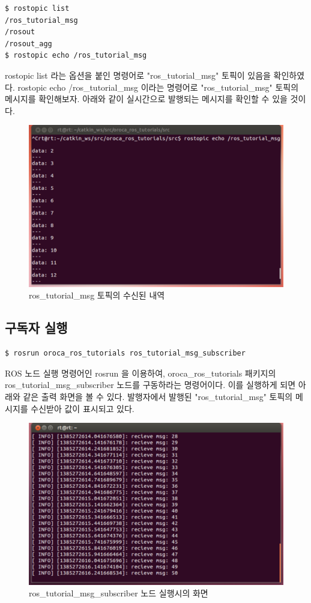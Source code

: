 \begin{lstlisting}[language=ROS]
$ rostopic list
/ros_tutorial_msg
/rosout
/rosout_agg
$ rostopic echo /ros_tutorial_msg
\end{lstlisting}

rostopic list 라는 옵션을 붙인 명령어로 "ros\_tutorial\_msg" 토픽이 있음을 확인하였다. rostopic echo /ros\_tutorial\_msg 이라는 명령어로 "ros\_tutorial\_msg" 토픽의 메시지를 확인해보자. 아래와 같이 실시간으로 발행되는 메시지를 확인할 수 있을 것이다.

\begin{figure}[h]
\centering\includegraphics[width=0.5\columnwidth]{pictures/chapter7/rostopic_echo.png}
\caption{ros\_tutorial\_msg 토픽의 수신된 내역}
\end{figure}

\subsection{구독자 실행}

\begin{lstlisting}[language=ROS]
$ rosrun oroca_ros_tutorials ros_tutorial_msg_subscriber 
\end{lstlisting}

ROS 노드 실행 명령어인 rosrun 을 이용하여, oroca\_ros\_tutorials 패키지의 ros\_tutorial\_msg\_subscriber  노드를 구동하라는 명령어이다. 이를 실행하게 되면 아래와 같은 출력 화면을 볼 수 있다. 발행자에서 발행된 "ros\_tutorial\_msg" 토픽의 메시지를 수신받아 값이 표시되고 있다.

\begin{figure}[h]
\centering\includegraphics[width=0.5\columnwidth]{pictures/chapter7/rosrun_ros_tutorial_msg_subscriber.png}
\caption{ros\_tutorial\_msg\_subscriber 노드 실행시의 화면}
\end{figure}

